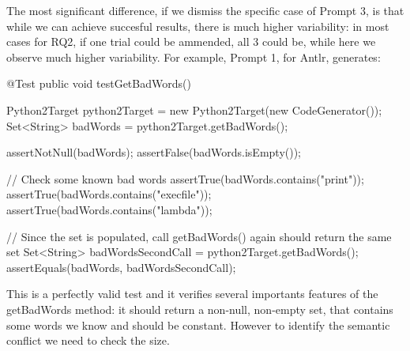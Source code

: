 The most significant difference, if we dismiss the specific case of Prompt 3, is that while we can achieve succesful results,
there is much higher variability: in most cases for RQ2, if one trial could be ammended, all 3 could be, while here we observe much
higher variability. For example, Prompt 1, for Antlr, generates:
\begin{answer}
    @Test
    public void testGetBadWords() {
        Python2Target python2Target = new Python2Target(new CodeGenerator());
        Set<String> badWords = python2Target.getBadWords();

        assertNotNull(badWords);
        assertFalse(badWords.isEmpty());

        // Check some known bad words
        assertTrue(badWords.contains("print"));
        assertTrue(badWords.contains("execfile"));
        assertTrue(badWords.contains("lambda"));

        // Since the set is populated, call getBadWords() again should return the same set
        Set<String> badWordsSecondCall = python2Target.getBadWords();
        assertEquals(badWords, badWordsSecondCall);
    }
\end{answer}
This is a perfectly valid test and it verifies several importants features of the getBadWords method: it should
return a non-null, non-empty set, that contains some words we know and should be constant. However to identify the semantic
conflict we need to check the size.

